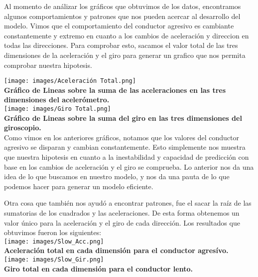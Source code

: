 \documentclass{article}
\begin{document}
        Al momento de análizar los gráficos que obtuvimos de los datos, encontramos algunos comportamientos y patrones que nos pueden acercar al desarrollo del modelo. Vimos que el comportamiento del conductor agresivo es cambiante constantemente y extremo en cuanto a los cambios de aceleración y direccion en todas las direcciones. Para comprobar esto, sacamos el valor total de las tres dimensiones de la aceleración y el giro para generar un grafico que nos permita comprobar nuestra hipotesis.

        \texttt{[image: images/Aceleración Total.png]} \\

        \textbf{Gráfico de Lineas sobre la suma de las aceleraciones en las tres dimensiones del acelerómetro.} \\

        \texttt{[image: images/Giro Total.png]} \\

        \textbf{Gráfico de Lineas sobre la suma del giro en las tres dimensiones del giroscopio.} \\

        Como vimos en los anteriores gráficos, notamos que los valores del conductor agresivo se disparan y cambian constantemente. Esto simplemente nos muestra que nuestra hipotesis en cuanto a la inestabilidad y capacidad de predicción con base en los cambios de aceleración y el giro se comprueba. Lo anterior nos da una idea de lo que buscamos en nuestro modelo, y nos da una pauta de lo que podemos hacer para generar un modelo eficiente.

        Otra cosa que también nos ayudó a encontrar patrones, fue el sacar la raíz de las sumatorias de los cuadrados y las aceleraciones. De esta forma obtenemos un valor único para la aceleración y el giro de cada dirección. Los resultados que obtuvimos fueron los siguientes: \\

        \texttt{[image: images/Slow\_Acc.png]} \\

        \textbf{Aceleración total en cada dimensión para el conductor agresívo.} \\

        \texttt{[image: images/Slow\_Gir.png]} \\

        \textbf{Giro total en cada dimensión para el conductor lento.} \\
\end{document}
